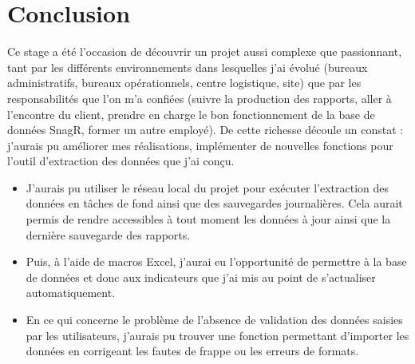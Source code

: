 \chapter*{Conclusion}



Ce stage a été l'occasion de découvrir un projet aussi complexe que passionnant, tant par les différents environnements dans lesquelles j'ai évolué (bureaux administratifs, bureaux opérationnels, centre logistique, site) que par les responsabilités que l'on m’a confiées (suivre la production des rapports, aller à l'encontre du client, prendre en charge le bon fonctionnement de la base de données SnagR, former un autre employé).
De cette richesse découle un constat : j'aurais pu améliorer mes réalisations, implémenter de nouvelles fonctions pour l'outil d'extraction des données que j'ai conçu.

\begin{itemize}
\item J'aurais pu utiliser le réseau local du projet pour exécuter l'extraction des données en tâches de fond ainsi que des sauvegardes journalières. Cela aurait permis de rendre accessibles à tout moment les données à jour ainsi que la dernière sauvegarde des rapports.
\item Puis, à l'aide de macros Excel, j'aurai eu l'opportunité de permettre à la base de données et donc aux indicateurs que j'ai mis au point de s'actualiser automatiquement.
\item En ce qui concerne le problème de l'absence de validation des données saisies par les utilisateurs, j'aurais pu trouver une fonction permettant d'importer les données en corrigeant les fautes de frappe ou les erreurs de formats.
\end{itemize}

